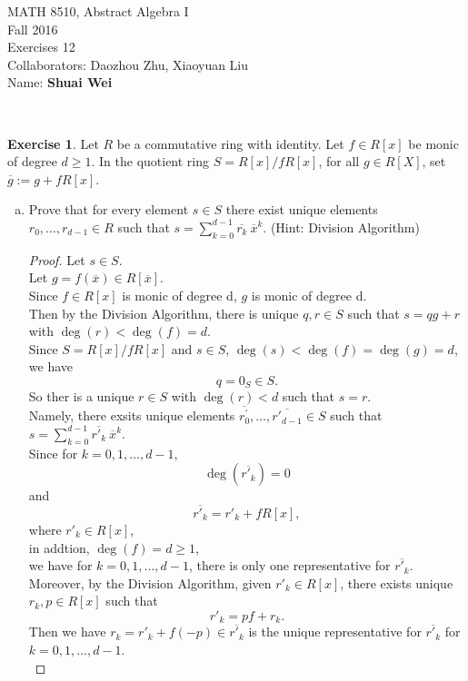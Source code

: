 \documentclass{amsart}
\theoremstyle{plain}
\theoremstyle{definition}
\newtheorem{exer}[lem]{Exercise}
\begin{document}
\noindent MATH 8510, Abstract Algebra I \\
Fall 2016\\
Exercises 12\\
Collaborators: Daozhou Zhu,  Xiaoyuan Liu\\
Name: \textbf{Shuai Wei}

\

%
%

\begin{exer}
Let $R$ be a commutative ring with identity.
Let $f\in R[x]$ be monic of degree $d\geq 1$.
In the quotient ring $S=R[x]/fR[x]$, for all $g\in R[X]$, set $\overline g:=g+fR[x]$.
\begin{enumerate}[(a)]
\item 
Prove that for every element $s\in S$ there exist unique elements $r_0,\ldots,r_{d-1}\in R$
such that $s=\sum_{k=0}^{d-1}\overline{r_k}\ \overline{x}^k$.
(Hint: Division Algorithm)
\begin{proof}
  Let $s \in S$.\\
  Let $g = f(\overline{x}) \in R[\overline{x}]$.\\
  Since $f \in R[x]$ is monic of degree d, $g$ is monic of degree d.\\
  Then by the Division Algorithm, there is unique $q,r \in S$ such that $s = qg + r$ with $\deg(r) < \deg(f) = d$.\\
  Since $S= R[x]/fR[x]$ and $s \in S$, $\deg(s) < \deg(f) =\deg(g) = d$,\\
  we have 
  \[q= 0_S \in S.\]
 So ther is a unique $r \in S$ with $\deg(r) < d$ such that $s= r$.\\
Namely, there exsits unique elements $\overline{r^\prime_0},\ldots,\overline{r\prime_{d-1}} \in S$ such that $s=\sum_{k=0}^{d-1}\overline{r\prime_k} ~\overline{x}^k$.\\
 Since for $k=0,1,\ldots,d-1$, 
 \[\deg(\overline{r\prime_k}) = 0\] 
 and 
 \[\overline{r\prime_k} = r\prime_k + fR[x],\]
where $r\prime_k \in R[x]$,\\
 in addtion, $\deg(f) = d \geq 1$, \\
 we have for $k=0,1,\ldots,d-1$, there is only one representative for $\overline{r\prime_k}$.\\
 Moreover, by the Division Algorithm, given $r\prime_k \in R[x]$, there exists unique $r_k, p \in R[x]$ such that 
 \[r\prime_k = pf + r_k.\]
 Then we have $r_k = r\prime_k +f(-p) \in \overline{r\prime_k}$ is the unique representative for $\overline{r\prime_k}$ for $k=0,1,\ldots,d-1$. \\

\end{proof}
\end{enumerate}
\end{exer}
\end{document}
